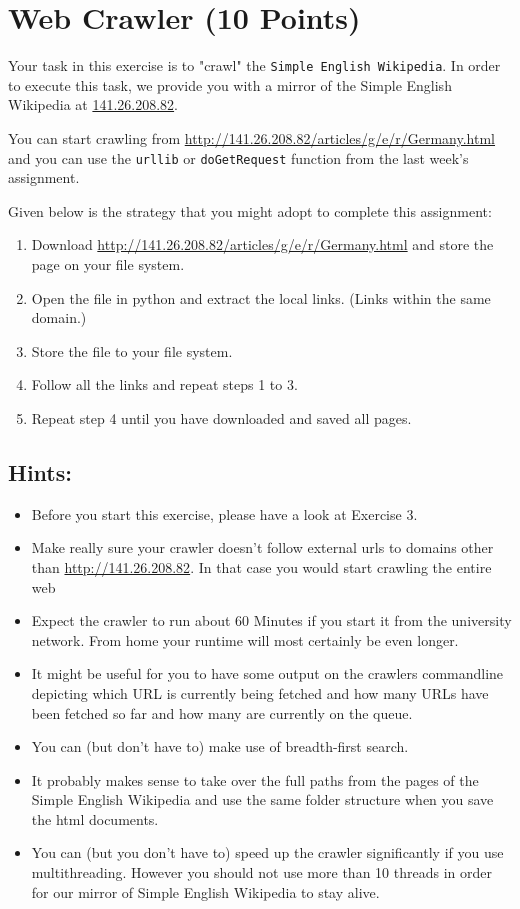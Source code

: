 \documentclass{WeSTassignment}
\begin{document}
\section{Web Crawler (10 Points)}
Your task in this exercise is to "crawl" the \texttt{Simple English Wikipedia}. In order to execute this task, we provide you with a mirror of the Simple English Wikipedia at \url{141.26.208.82}. 

You can start crawling from \url{http://141.26.208.82/articles/g/e/r/Germany.html} and you can use the \texttt{urllib} or \texttt{doGetRequest} function from the last week's assignment.

Given below is the strategy that you might adopt to complete this assignment: 
\begin{enumerate}
\item Download \url{http://141.26.208.82/articles/g/e/r/Germany.html} and store the page on your file system. 
\item Open the file in python and extract the local links. (Links within the same domain.)
\item Store the file to your file system.
\item Follow all the links and repeat steps 1 to 3.
\item Repeat step 4 until you have downloaded and saved all pages. 
\end{enumerate}

\subsection{Hints:}
\begin{itemize}
\item Before you start this exercise, please have a look at Exercise 3. 
\item Make really sure your crawler doesn't follow external urls to domains other than \mbox{\url{http://141.26.208.82}}. In that case you would start crawling the entire web
\item Expect the crawler to run about 60 Minutes if you start it from the university network. From home your runtime will most certainly be even longer.
\item It might be useful for you to have some output on the crawlers commandline depicting which URL is currently being fetched and how many URLs have been fetched so far and how many are currently on the queue.
\item You can (but don't have to) make use of breadth-first search.
\item It probably makes sense to take over the full paths from the pages of the Simple English Wikipedia and use the same folder structure when you save the html documents.
\item You can (but you don't have to) speed up the crawler significantly if you use multithreading. However you should not use more than 10 threads in order for our mirror of Simple English Wikipedia to stay alive. 
\end{itemize}
\end{document}
